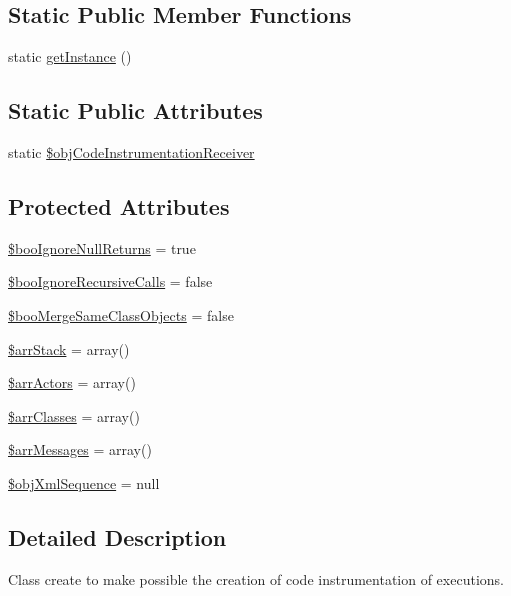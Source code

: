 \subsection*{Static Public Member Functions}
\begin{CompactItemize}
\item 
static \hyperlink{class_code_instrumentation_receiver_c93fbec81f07e5d15f80db907e63dc10}{getInstance} ()
\end{CompactItemize}
\subsection*{Static Public Attributes}
\begin{CompactItemize}
\item 
static \hyperlink{class_code_instrumentation_receiver_aab882095da061a56ed923f40497d878}{\$objCodeInstrumentationReceiver}
\end{CompactItemize}
\subsection*{Protected Attributes}
\begin{CompactItemize}
\item 
\hyperlink{class_code_instrumentation_receiver_c7f35371cd40ca055dee475b121a99c5}{\$booIgnoreNullReturns} = true
\item 
\hyperlink{class_code_instrumentation_receiver_c97438486aabbfa4ee0880dfa95da884}{\$booIgnoreRecursiveCalls} = false
\item 
\hyperlink{class_code_instrumentation_receiver_d18203b561cb77792a5496f02e024874}{\$booMergeSameClassObjects} = false
\item 
\hyperlink{class_code_instrumentation_receiver_6fe1a7ba669f936d4df438591f632963}{\$arrStack} = array()
\item 
\hyperlink{class_code_instrumentation_receiver_51bd2c8dc9510ff43aaf11f3129bea0f}{\$arrActors} = array()
\item 
\hyperlink{class_code_instrumentation_receiver_d0ae260f94228a6360e0a72c8245bb60}{\$arrClasses} = array()
\item 
\hyperlink{class_code_instrumentation_receiver_bc2745674d501af3a6d23b496ad9fd05}{\$arrMessages} = array()
\item 
\hyperlink{class_code_instrumentation_receiver_eefa469c1b13fe1fec040c910b720034}{\$objXmlSequence} = null
\end{CompactItemize}


\subsection{Detailed Description}
Class create to make possible the creation of code instrumentation of executions.

